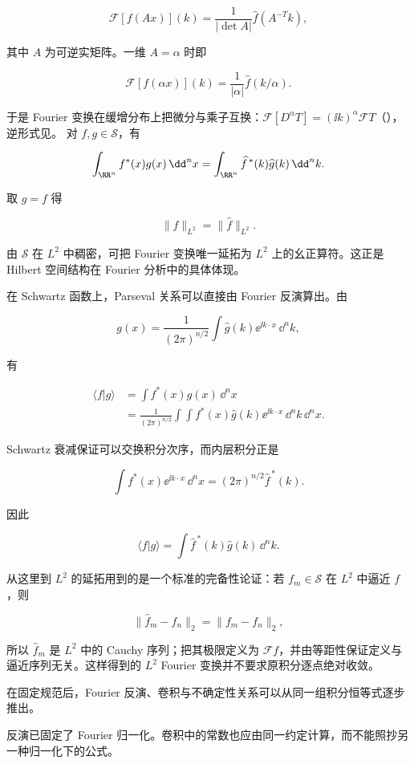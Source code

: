 \[
\mathcal F[f(Ax)](k)=\frac1{|\det A|}\widehat f(A^{-T}k),
\]

其中 $A$ 为可逆实矩阵。一维 $A=\alpha$ 时即

\[
\mathcal F[f(\alpha x)](k)=\frac1{|\alpha|}\widehat f(k/\alpha).
\]

于是 Fourier 变换在缓增分布上把微分与乘子互换：$\mathcal F[D^\alpha T]=(\ii k)^\alpha\mathcal FT$（），逆形式见。
对 $f,g\in\mathcal S$，有

\[
\int_{\RR^n}f^*(x)g(x)\,\dd^n x
=\int_{\RR^n}\widehat f^{\,*}(k)\widehat g(k)\,\dd^n k.
\]

取 $g=f$ 得

\[
\|f\|_{L^2}=\|\widehat f\|_{L^2}.
\]

由 $\mathcal S$ 在 $L^2$ 中稠密，可把 Fourier 变换唯一延拓为 $L^2$ 上的幺正算符。这正是 Hilbert 空间结构在 Fourier 分析中的具体体现。

在 Schwartz 函数上，Parseval 关系可以直接由 Fourier 反演算出。由

\[
g(x)=\frac1{(2\pi)^{n/2}}
\int\widehat g(k)\ee^{\ii k\cdot x}\,\dd^nk,
\]

有

\[
\begin{aligned}
\langle f|g\rangle
&=\int f^*(x)g(x)\,\dd^nx\\
&=\frac1{(2\pi)^{n/2}}
\int\!\int f^*(x)\widehat g(k)\ee^{\ii k\cdot x}\,\dd^nk\,\dd^nx.
\end{aligned}
\]

Schwartz 衰减保证可以交换积分次序，而内层积分正是

\[
\int f^*(x)\ee^{\ii k\cdot x}\,\dd^nx
=(2\pi)^{n/2}\widehat f^{\,*}(k).
\]

因此

\[
\langle f|g\rangle
=\int\widehat f^{\,*}(k)\widehat g(k)\,\dd^nk.
\]

从这里到 $L^2$ 的延拓用到的是一个标准的完备性论证：若 $f_m\in\mathcal S$ 在 $L^2$ 中逼近 $f$，则

\[
\|\widehat f_m-\widehat f_n\|_2
=\|f_m-f_n\|_2,
\]

所以 $\widehat f_m$ 是 $L^2$ 中的 Cauchy 序列；把其极限定义为 $\mathcal Ff$，并由等距性保证定义与逼近序列无关。这样得到的 $L^2$ Fourier 变换并不要求原积分逐点绝对收敛。

在固定规范后，Fourier 反演、卷积与不确定性关系可以从同一组积分恒等式逐步推出。

反演已固定了 Fourier 归一化。卷积中的常数也应由同一约定计算，而不能照抄另一种归一化下的公式。

